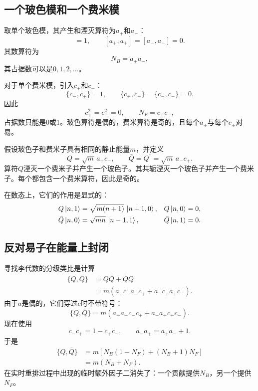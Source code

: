 \subsection{一个玻色模和一个费米模}

取单个玻色模，其产生和湮灭算符为\(a_+\)和\(a_-\)：
\begin{equation}
[a_-,a_+]=1,
\qquad
[a_+,a_+]=[a_-,a_-]=0.
\end{equation}
其数算符为
\begin{equation}
N_B=a_+a_-,
\end{equation}
其占据数可以是\(0,1,2,\ldots\)。

对于单个费米模，引入\(c_+\)和\(c_-\)：
\begin{equation}
\{c_-,c_+\}=1,
\qquad
\{c_+,c_+\}=\{c_-,c_-\}=0.
\end{equation}
因此
\begin{equation}
c_+^2=c_-^2=0,
\qquad
N_F=c_+c_-,
\end{equation}
占据数只能是\(0\)或\(1\)。玻色算符是偶的，费米算符是奇的，且每个\(a_\pm\)与每个\(c_\pm\)对易。


假设玻色子和费米子具有相同的静止能量\(m\)，并定义
\begin{equation}
Q=\sqrt m\,a_+c_-,
\qquad
\bar Q=Q^\dagger=\sqrt m\,a_-c_+.
\end{equation}
算符\(Q\)湮灭一个费米子并产生一个玻色子。其共轭湮灭一个玻色子并产生一个费米子。每个都包含一个费米算符，因此是奇的。

在数态上，它们的作用是显式的：
\begin{align}
Q\left\lvert n,1\right\rangle
&=\sqrt{m(n+1)}\,\left\lvert n+1,0\right\rangle,
&
Q\left\lvert n,0\right\rangle&=0,\\
\bar Q\left\lvert n,0\right\rangle
&=\sqrt{mn}\,\left\lvert n-1,1\right\rangle,
&
\bar Q\left\lvert n,1\right\rangle&=0.
\end{align}

\subsection{反对易子在能量上封闭}

寻找李代数的分级类比是计算
\begin{align}
\{Q,\bar Q\}
&=Q\bar Q+\bar Q Q\\
&=m\left(a_+c_-a_-c_+
        +a_-c_+a_+c_-\right).
\end{align}
由于\(a\)是偶的，它们穿过\(c\)时不带符号：
\begin{equation}
\{Q,\bar Q\}
=m\left(a_+a_-c_-c_+
        +a_-a_+c_+c_-\right).
\end{equation}
现在使用
\begin{equation}
c_-c_+=1-c_+c_-,
\qquad
a_-a_+=a_+a_-+1.
\end{equation}
于是
\begin{align}
\{Q,\bar Q\}
&=m\left[
N_B(1-N_F)+(N_B+1)N_F
\right]\\
&=m(N_B+N_F).
\end{align}
在实时重排过程中出现的临时额外因子二消失了：一个贡献提供\(N_B\)，另一个提供\(N_F\)。

